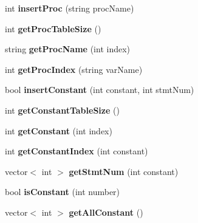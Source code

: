 \begin{DoxyCompactItemize}
\item 
\hypertarget{class_p_k_b_ae48aadc241983a1e95ddbe9f75d53f0a}{}int {\bfseries insert\+Proc} (string proc\+Name)\label{class_p_k_b_ae48aadc241983a1e95ddbe9f75d53f0a}

\item 
\hypertarget{class_p_k_b_a4eab92c4a163ff90280ca717d0cd61c2}{}int {\bfseries get\+Proc\+Table\+Size} ()\label{class_p_k_b_a4eab92c4a163ff90280ca717d0cd61c2}

\item 
\hypertarget{class_p_k_b_a92007ea06d3844408e15c1bb1c6e7b3f}{}string {\bfseries get\+Proc\+Name} (int index)\label{class_p_k_b_a92007ea06d3844408e15c1bb1c6e7b3f}

\item 
\hypertarget{class_p_k_b_adb8e6c8b702f57acd975cf67e71771aa}{}int {\bfseries get\+Proc\+Index} (string var\+Name)\label{class_p_k_b_adb8e6c8b702f57acd975cf67e71771aa}

\item 
\hypertarget{class_p_k_b_af33da61abfeffab854edfe5eb24b6832}{}bool {\bfseries insert\+Constant} (int constant, int stmt\+Num)\label{class_p_k_b_af33da61abfeffab854edfe5eb24b6832}

\item 
\hypertarget{class_p_k_b_afe9e727ce67e8194ef1fe3ef1c508e05}{}int {\bfseries get\+Constant\+Table\+Size} ()\label{class_p_k_b_afe9e727ce67e8194ef1fe3ef1c508e05}

\item 
\hypertarget{class_p_k_b_aa6843fbd96b474a0e223774b04f43265}{}int {\bfseries get\+Constant} (int index)\label{class_p_k_b_aa6843fbd96b474a0e223774b04f43265}

\item 
\hypertarget{class_p_k_b_a0903c842d21115c44c2438e10d181fda}{}int {\bfseries get\+Constant\+Index} (int constant)\label{class_p_k_b_a0903c842d21115c44c2438e10d181fda}

\item 
\hypertarget{class_p_k_b_acf72ef25c7a3e60ccc96f27c05559107}{}vector$<$ int $>$ {\bfseries get\+Stmt\+Num} (int constant)\label{class_p_k_b_acf72ef25c7a3e60ccc96f27c05559107}

\item 
\hypertarget{class_p_k_b_a0fe7bb9fc063eaa8e6f490cd0421ab4c}{}bool {\bfseries is\+Constant} (int number)\label{class_p_k_b_a0fe7bb9fc063eaa8e6f490cd0421ab4c}

\item 
\hypertarget{class_p_k_b_a8296de3e1adf78db4c8b498649477947}{}vector$<$ int $>$ {\bfseries get\+All\+Constant} ()\label{class_p_k_b_a8296de3e1adf78db4c8b498649477947}


\end{DoxyCompactItemize}

